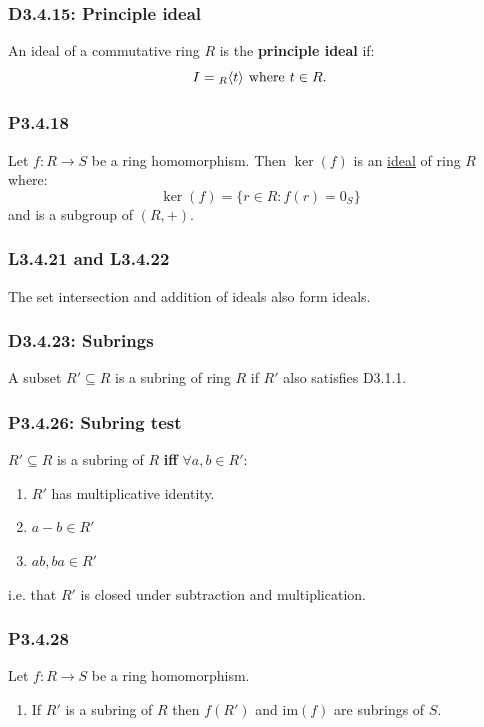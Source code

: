 \documentclass{article}
\begin{document}
\begin{multicols*}{3}
\subsubsection*{D3.4.15: Principle ideal}
An ideal of a commutative ring $R$ is the
\textbf{principle ideal} if:
$$I={}_R\langle t\rangle\hspace{0.05in}\text{where}
\hspace{0.05in}t\in R.$$

\subsubsection*{P3.4.18}
Let $f:R\rightarrow S$ be a ring homomorphism.
Then $\ker(f)$ is an \underline{ideal} of ring $R$ where:
$$\ker(f)=\{r\in R:f(r)=0_S\}$$
and is a subgroup of $(R,+)$.

\subsubsection*{L3.4.21 and L3.4.22}
The set intersection and addition of ideals also form ideals.

\subsubsection*{D3.4.23: Subrings}
A subset $R'\subseteq R$ is a subring of ring $R$ if
$R'$ also satisfies D3.1.1.

\subsubsection*{P3.4.26: Subring test}
$R'\subseteq R$ is a subring of $R$ \textbf{if{}f}
$\forall a,b\in R'$:
\begin{enumerate}
    \item $R'$ has multiplicative identity.
    \item $a-b\in R'$
    \item $ab,ba\in R'$
\end{enumerate}
i.e. that $R'$ is closed under subtraction
and multiplication.

\subsubsection*{P3.4.28}
Let $f:R\rightarrow S$ be a ring homomorphism.
\begin{enumerate}
    \item If $R'$ is a subring of $R$ then
    $f(R')$ and $\text{im}(f)$ are subrings of $S$.


\end{enumerate}
\end{multicols*}
\end{document}
